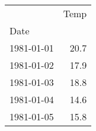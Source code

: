 \begin{tabular}{lr}
\toprule
{} &  Temp \\
Date       &       \\
\midrule
1981-01-01 &  20.7 \\
1981-01-02 &  17.9 \\
1981-01-03 &  18.8 \\
1981-01-04 &  14.6 \\
1981-01-05 &  15.8 \\
\bottomrule
\end{tabular}
